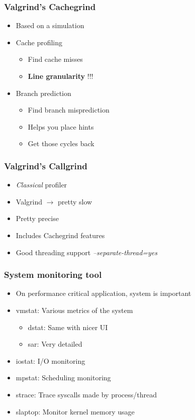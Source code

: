 \begin{frame}
  \frametitle{Valgrind's Cachegrind}

  \begin{itemize}
  \item Based on a simulation
  \item Cache profiling
    \begin{itemize}
    \item Find cache misses
    \item \textbf{Line granularity} !!!
    \end{itemize}
  \item Branch prediction
    \begin{itemize}
    \item Find branch misprediction
    \item Helps you place hints
    \item Get those cycles back
    \end{itemize}
  \end{itemize}
\end{frame}


\begin{frame}
  \frametitle{Valgrind's Callgrind}

  \begin{itemize}
  \item \emph{Classical} profiler
  \item Valgrind $\rightarrow$ pretty slow
  \item Pretty precise
  \item Includes Cachegrind features
  \item Good threading support \emph{--separate-thread=yes}
  \end{itemize}
\end{frame}


\begin{frame}
  \frametitle{System monitoring tool}

  \begin{itemize}
  \item On performance critical application, system is important
  \item vmstat: Various metrics of the system
    \begin{itemize}
    \item dstat: Same with nicer UI
    \item sar: Very detailed
    \end{itemize}
  \item iostat: I/O monitoring
  \item mpstat: Scheduling monitoring
  \item strace: Trace syscalls made by process/thread
  \item slaptop: Monitor kernel memory usage
  \end{itemize}
\end{frame}


